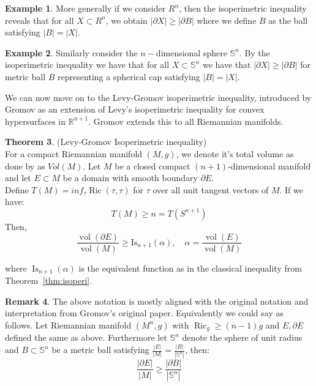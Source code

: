 \documentclass{Dissertate}
\theoremstyle{definition}
\newtheorem{theorem}{Theorem}[section]
\theoremstyle{definition} %
\theoremstyle{definition}
\newtheorem{example}[theorem]{Example}
\newtheorem{remark}[theorem]{Remark}
\begin{document}
\begin{example} More generally if we consider $R^n$, then the isoperimetric inequality reveals that for all $X \subset R^n$, we obtain $| \partial X| \geq |\partial B|$
where we define $B$ as the ball satisfying $|B| = |X|$. 
\end{example}
\begin{example} Similarly consider the $n-$dimensional sphere $\mathbb{S}^n$. By the isoperimetric inequality we have that for all $X \subset \mathbb{S}^n$ we have that $|\partial X| \geq |\partial B|$ for metric ball $B$ representing a spherical cap satisfying $|B| = |X|$. 
    
\end{example}

We can now move on to the Levy-Gromov isoperimetric inequality, introduced by Gromov as an extension of Levy's isoperimetric inequality for convex hypersurfaces in $\mathbb{R}^{n+1}$. Gromov extends this to all Riemannian manifolds.
\\
\begin{theorem} \label{thm:levy-gromov}
\cite{GromovMikhail2001CPLI}
(Levy-Gromov Isoperimetric inequality)\\
For a compact Riemannian manifold $(M, g)$, we denote it's total volume as done by \cite{GromovMikhail2001CPLI} as $Vol(M)$. Let $M$ be a closed compact $(n+1)$-dimensional manifold and let $E \subset M$ be a domain with smooth boundary $\partial E$. \\
Define $T(M) = inf _{\tau} \operatorname{Ric}(\tau, \tau)$ for $\tau$ over all unit tangent vectors of $M$. If we have:
$$
T(M) \geq n = T(S^{n+1})
$$
Then, 
\begin{equation*}
\frac{\operatorname{vol}\left(\partial E\right)}{\operatorname{vol}(M)} \geq \mathrm{Is}_{n+1}(\alpha), \quad \alpha=\frac{\operatorname{vol}\left(E\right)}{\operatorname{vol}(M)} 
\end{equation*}


where $\operatorname{Is}_{n+1}(\alpha)$ is the equivalent function as in the classical inequality from Theorem~\ref{thm:isoperi}.
\end{theorem}
\begin{remark}
The above notation is mostly aligned with the original notation and interpretation from Gromov's original paper. Equivalently we could say as follows. Let Riemannian manifold $(M^n, g)$ with $\operatorname{Ric}_g \geq (n-1)g$ and $E, \partial E$ defined the same as above. Furthermore let $\mathbb{S}^n$ denote the sphere of unit radius and $B \subset \mathbb{S}^n$ be a metric ball satisfying $\frac{|E|}{|M|} = \frac{|B|}{|\mathbb{S}^n|}$, then: 
$$
\frac{|\partial E|}{|M|} \geq \frac{|\partial B|}{|\mathbb{S}^n|}
$$
\end{remark}
\end{document}
